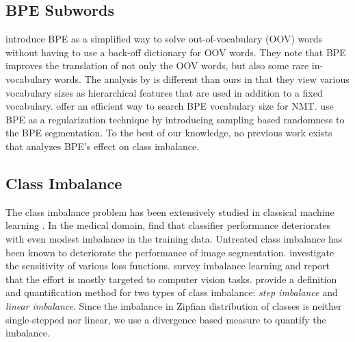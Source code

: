 \subsection{BPE Subwords}
\citet{sennrich-etal-2016-bpe} introduce BPE as a simplified way to solve out-of-vocabulary (OOV) words without having to use a back-off dictionary for OOV words.
They note that BPE improves the translation of not only the OOV words, but also some rare in-vocabulary words.
The analysis by \citet{morishita-etal-2018-improving} is different than ours in that they view various vocabulary sizes as hierarchical features that are used in addition to a fixed vocabulary.
\citet{DBLP:journals/corr/abs-1810-08641} offer an efficient way to search BPE vocabulary size for NMT.
\citet{kudo-2018-subword} use BPE as a regularization technique by introducing sampling based randomness to the BPE segmentation.
To the best of our knowledge, no previous work exists that analyzes BPE's effect on class imbalance.%

\subsection{Class Imbalance}
\label{sec:rel-class-imb}
The class imbalance problem has been extensively studied in classical machine learning \cite{japkowicz2002ClassImbalance}.
In the medical domain,  find that classifier performance deteriorates with even modest imbalance in the training data.
Untreated class imbalance has been known to deteriorate the performance of image segmentation.   investigate the sensitivity of various loss functions.
 survey imbalance learning and report that the effort is mostly targeted to computer vision tasks.
 provide a definition and quantification method for two types of class imbalance: \textit{step imbalance} and \textit{linear imbalance}.
Since the imbalance in Zipfian distribution of classes is neither single-stepped nor linear, we use a divergence based measure to quantify the imbalance.


